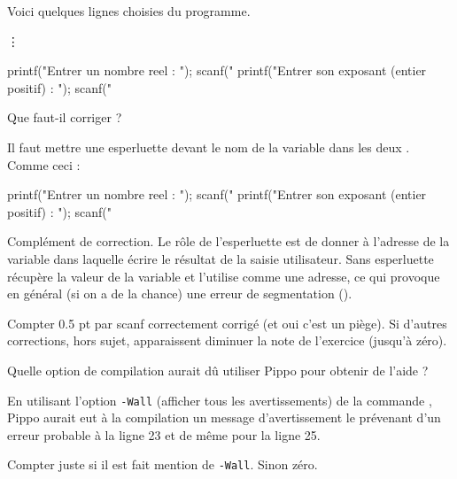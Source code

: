 \medskip
Voici quelques lignes choisies du programme.
\begin{listing}{10}
int main()
{
    /* Déclaration et initialisation des variables */
   double x;
   int n;
\end{listing}
\vdots
\begin{listing}{22}
    printf("Entrer un nombre reel : ");
    scanf("%
    printf("Entrer son exposant (entier positif) : ");
    scanf("%
\end{listing}

\question
Que faut-il corriger ? 

\begin{correction}
Il faut mettre une esperluette devant le nom de la variable dans les deux .
 Comme ceci :
  \begin{listing}{22}
    printf("Entrer un nombre reel : ");
    scanf("%
    printf("Entrer son exposant (entier positif) : ");
    scanf("%
\end{listing}

Complément de correction.
Le rôle de l'esperluette est de donner à  l'adresse de la variable dans laquelle écrire le résultat de la saisie utilisateur. Sans esperluette  récupère la valeur de la variable et l'utilise comme une adresse, ce qui provoque en général (si on a de la chance) une erreur de segmentation (). 

\begin{baremeenv}
  Compter 0.5 pt par scanf correctement corrigé (et oui c'est un piège). Si d'autres corrections, hors sujet, apparaissent diminuer la note de l'exercice (jusqu'à zéro).
\end{baremeenv}
\end{correction}


\question
 Quelle option de compilation aurait dû utiliser Pippo pour obtenir de
  l'aide ?

\begin{correction}
En utilisant l'option \verb+-Wall+ (afficher tous les avertissements) de la commande , Pippo aurait eut à la compilation un message d'avertissement le prévenant d'un erreur probable à la ligne 23 et de même pour la ligne 25.

\begin{baremeenv}
Compter juste si il est fait mention de \verb+-Wall+. Sinon zéro.  
\end{baremeenv}
\end{correction}

